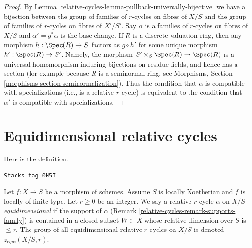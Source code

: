 \begin{proof}
By Lemma \ref{relative-cycles-lemma-pullback-universally-bijective} we have a bijection
between the group of families of $r$-cycles on fibres of $X/S$ and
the group of families of $r$-cycles on fibres of $X'/S'$.
Say $\alpha$ is a families of $r$-cycles on fibres of $X/S$ and
$\alpha' = g^*\alpha$ is the base change.
If $R$ is a discrete valuation ring, then any morphism
$h : \Spec(R) \to S$ factors as $g \circ h'$ for some
unique morphism $h' : \Spec(R) \to S'$.
Namely, the morphism $S' \times_S \Spec(R) \to \Spec(R)$ is
a universal homomorphism inducing bijections on residue fields,
and hence has a section (for example because $R$ is a seminormal
ring, see Morphisms, Section \ref{morphisms-section-seminormalization}).
Thus the condition that $\alpha$ is compatible with
specializations (i.e., is a relative $r$-cycle)
is equivalent to the condition that
$\alpha'$ is compatible with specializations.
\end{proof}

\section{Equidimensional relative cycles}
\label{relative-cycles-section-equidimensional}
Here is the definition.

\begin{definition}[Equidimensional]
\label{relative-cycles-definition-equidimensional}
\href{https://stacks.math.columbia.edu/tag/0H5I}{\texttt{Stacks tag 0H5I}}

Let $f : X \to S$ be a morphism of schemes. Assume $S$ is locally Noetherian
and $f$ is locally of finite type. Let $r \geq 0$ be an integer. We say a
relative $r$-cycle $\alpha$ on $X/S$ {\it equidimensional} if the support
of $\alpha$ (Remark \ref{relative-cycles-remark-supports-family})
is contained in a closed subset $W \subset X$ whose relative
dimension over $S$ is $\leq r$.
The group of all equidimensional relative $r$-cycles on $X/S$ is
denoted $z_{equi}(X/S, r)$.
\end{definition}

